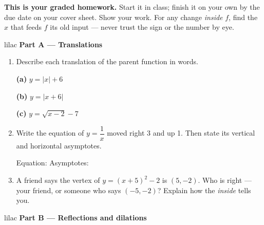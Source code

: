 \documentclass[10pt]{article}
\begin{document}

\vspace{0.12in}

\boxguard[8]
\begin{remindbox}
\small
\textbf{This is your graded homework.} Start it in class; finish it on your own by the due
date on your cover sheet. Show your work. For any change \emph{inside} $f$, find the $x$ that
feeds $f$ its old input --- never trust the sign or the number by eye.
\end{remindbox}

\vspace{0.12in}

\begin{headlinebox}{lilac}
\textbf{\color{plum}Part A --- Translations}
\end{headlinebox}

\begin{enumerate}[leftmargin=1.9em, itemsep=10pt]

\item Describe each translation of the parent function in words.

      \textbf{(a)} $y = |x| + 6$ \qquad {}

      \textbf{(b)} $y = |x + 6|$ \qquad {}

      \textbf{(c)} $y = \sqrt{x - 2} - 7$ \qquad {}

\item Write the equation of $y = \dfrac{1}{x}$ moved right 3 and up 1. Then state its vertical
      and horizontal asymptotes.

      Equation:  \qquad Asymptotes: 

\item A friend says the vertex of $y = (x + 5)^2 - 2$ is $(5, -2)$. Who is right --- your
      friend, or someone who says $(-5, -2)$? Explain how the \emph{inside} tells you.

\end{enumerate}

\vspace{0.1in}

\begin{headlinebox}{lilac}
\textbf{\color{plum}Part B --- Reflections and dilations}
\end{headlinebox}
\end{document}
